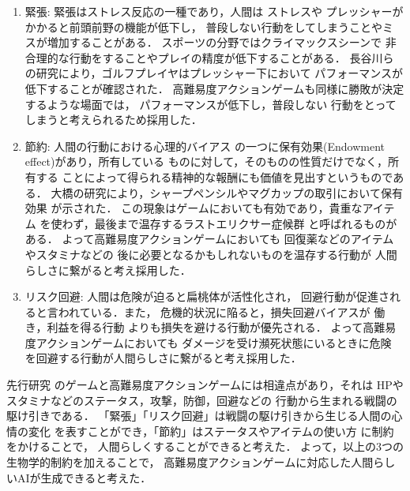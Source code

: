 \documentclass[a4paper,12pt,oneside,openany,titlepage]{jreport}
\begin{document}
 \begin{enumerate}
  \item 緊張: 緊張はストレス反応の一種であり，人間は
        ストレスや
        プレッシャーがかかると前頭前野の機能が低下し，
        普段しない行動をしてしまうことやミスが増加することがある．
        スポーツの分野ではクライマックスシーンで
        非合理的な行動をすることやプレイの精度が低下することがある．
        長谷川らの研究により，ゴルフプレイヤはプレッシャー下において
        パフォーマンスが低下することが確認された\cite{stress}．
        高難易度アクションゲームも同様に勝敗が決定するような場面では，
        パフォーマンスが低下し，普段しない
        行動をとってしまうと考えられるため採用した．


  \item 節約: 人間の行動における心理的バイアス
        の一つに保有効果(Endowment effect)があり，所有している
        ものに対して，そのものの性質だけでなく，所有する
        ことによって得られる精神的な報酬にも価値を見出すというものである．
        大橋の研究により，シャープペンシルやマグカップの取引において保有効果
        が示された\cite{hoyuu}．
        この現象はゲームにおいても有効であり，貴重なアイテム
        を使わず，最後まで温存するラストエリクサー症候群
        と呼ばれるものがある．
        よって高難易度アクションゲームにおいても
        回復薬などのアイテムやスタミナなどの
        後に必要となるかもしれないものを温存する行動が
        人間らしさに繋がると考え採用した．


  \item リスク回避: 
        人間は危険が迫ると扁桃体が活性化され，
        回避行動が促進されると言われている．また，
        危機的状況に陥ると，損失回避バイアスが
        働き，利益を得る行動
        よりも損失を避ける行動が優先される．
        よって高難易度アクションゲームにおいても
        ダメージを受け瀕死状態にいるときに危険
        を回避する行動が人間らしさに繋がると考え採用した．
        
\end{enumerate}
先行研究\cite{morita}
のゲームと高難易度アクションゲームには相違点があり，それは
HPやスタミナなどのステータス，攻撃，防御，回避などの
行動から生まれる戦闘の駆け引きである．
「緊張」「リスク回避」は戦闘の駆け引きから生じる人間の心情の変化
を表すことができ，「節約」はステータスやアイテムの使い方
に制約をかけることで，
人間らしくすることができると考えた．
よって，以上の3つの生物学的制約を加えることで，
高難易度アクションゲームに対応した人間らしいAIが生成できると考えた．
\end{document}

